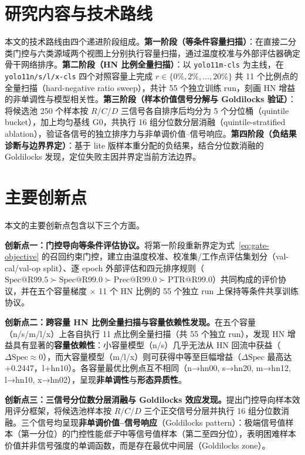 \documentclass[UTF8,openany,12pt]{ctexbook}
\begin{document}
\section{研究内容与技术路线}
本文的技术路线由四个递进阶段组成。\textbf{第一阶段（等条件容量扫描）}：在直接二分类门控与六类源域两个视图上分别执行容量扫描，通过温度校准与外部评估器确定骨干网络排序。\textbf{第二阶段（HN 比例全量扫描）}：以 \texttt{yolo11m-cls} 为主线，在 \texttt{yolo11n/s/l/x-cls} 四个对照容量上完成 $r \in \{0\%,2\%,\ldots,20\%\}$ 共 11 个比例点的全量扫描（hard-negative ratio sweep），共计 55 个独立训练 run，刻画 HN 增益的非单调性与模型相关性。\textbf{第三阶段（样本价值信号分解与 Goldilocks 验证）}：将候选池 250 个样本按 $R$/$C$/$D$ 三信号各自排序后均分为 5 个分位桶（quintile bucket），加上均匀基线 G0，共执行 16 组分位数分层消融（quintile-stratified ablation），验证各信号的独立排序力与非单调价值--信号响应。\textbf{第四阶段（负结果诊断与边界界定）}：基于 lite 版样本重分配的负结果，结合分位数消融的 Goldilocks 发现，定位失败主因并界定当前方法边界。

\section{主要创新点}
本文的主要创新点包含以下三个方面。

\noindent\textbf{创新点一：门控导向等条件评估协议。}将第一阶段重新界定为式~\eqref{eq:gate-objective} 的召回约束门控，建立由温度校准、校准集/工作点评估集划分（val-cal/val-op split）、逐 epoch 外部评估和四元排序规则（$\mathrm{Spec@R99.5} \succ \mathrm{Spec@R99.0} \succ \mathrm{Prec@R99.0} \succ \mathrm{PTR@R99.0}$）共同构成的评价协议，并在五个容量梯度 $\times$ 11 个 HN 比例的 55 个独立 run 上保持等条件共享训练协议。

\noindent\textbf{创新点二：跨容量 HN 比例全量扫描与容量依赖性发现。}在五个容量（n/s/m/l/x）上各自执行 11 点比例全量扫描（共 55 个独立 run），发现 HN 增益具有显著的\textbf{容量依赖性}：小容量模型（n/s）几乎无法从 HN 回流中获益（$\Delta\mathrm{Spec} \approx 0$），而大容量模型（m/l/x）则可获得中等至巨幅增益（$\Delta\mathrm{Spec}$ 最高达 $+$0.2447，l+hn10）。各容量最优比例点互不相同（n→hn00, s→hn20, m→hn12, l→hn10, x→hn02），呈现\textbf{非单调性}与\textbf{形态异质性}。

\noindent\textbf{创新点三：三信号分位数分层消融与 Goldilocks 效应发现。}提出门控导向样本效用评分框架，将候选池样本按 $R$/$C$/$D$ 三个正交信号分层并执行 16 组分位数消融。三个信号均呈现\textbf{非单调价值--信号响应}（Goldilocks pattern）：极端信号值样本（第一分位）的门控性能\emph{低于}中等信号值样本（第二至四分位），表明困难样本价值并非信号强度的单调函数，而是存在最优中间层（Goldilocks zone）。
\end{document}
